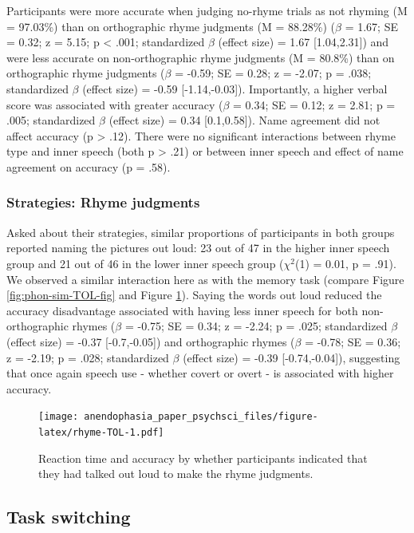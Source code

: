 \documentclass[
  man,a4paper,floatsintext]{apa6}
\begin{document}
Participants were more accurate when judging no-rhyme trials as not rhyming (M = 97.03\%) than on orthographic rhyme judgments (M = 88.28\%) (\(\beta\) = 1.67; SE = 0.32; z = 5.15; p \textless{} .001; standardized \(\beta\) (effect size) = 1.67 {[}1.04,2.31{]}) and were less accurate on non-orthographic rhyme judgments (M = 80.8\%) than on orthographic rhyme judgments (\(\beta\) = -0.59; SE = 0.28; z = -2.07; p = .038; standardized \(\beta\) (effect size) = -0.59 {[}-1.14,-0.03{]}). Importantly, a higher verbal score was associated with greater accuracy (\(\beta\) = 0.34; SE = 0.12; z = 2.81; p = .005; standardized \(\beta\) (effect size) = 0.34 {[}0.1,0.58{]}). Name agreement did not affect accuracy (p \textgreater{} .12). There were no significant interactions between rhyme type and inner speech (both p \textgreater{} .21) or between inner speech and effect of name agreement on accuracy (p = .58).

\hypertarget{strategies-rhyme-judgments}{%
\subsubsection{Strategies: Rhyme judgments}\label{strategies-rhyme-judgments}}

Asked about their strategies, similar proportions of participants in both groups reported naming the pictures out loud: 23 out of 47 in the higher inner speech group and 21 out of 46 in the lower inner speech group (\(\chi^2\)(1) = 0.01, p = .91). We observed a similar interaction here as with the memory task (compare Figure \ref{fig:phon-sim-TOL-fig} and Figure \ref{fig:rhyme-TOL}). Saying the words out loud reduced the accuracy disadvantage associated with having less inner speech for both non-orthographic rhymes (\(\beta\) = -0.75; SE = 0.34; z = -2.24; p = .025; standardized \(\beta\) (effect size) = -0.37 {[}-0.7,-0.05{]}) and orthographic rhymes (\(\beta\) = -0.78; SE = 0.36; z = -2.19; p = .028; standardized \(\beta\) (effect size) = -0.39 {[}-0.74,-0.04{]}), suggesting that once again speech use - whether covert or overt - is associated with higher accuracy.

\begin{figure}
\centering
\texttt{[image: anendophasia\_paper\_psychsci\_files/figure-latex/rhyme-TOL-1.pdf]}
\caption{\label{fig:rhyme-TOL}Reaction time and accuracy by whether participants indicated that they had talked out loud to make the rhyme judgments.}
\end{figure}

\hypertarget{task-switching}{%
\subsection{Task switching}\label{task-switching}}
\end{document}
